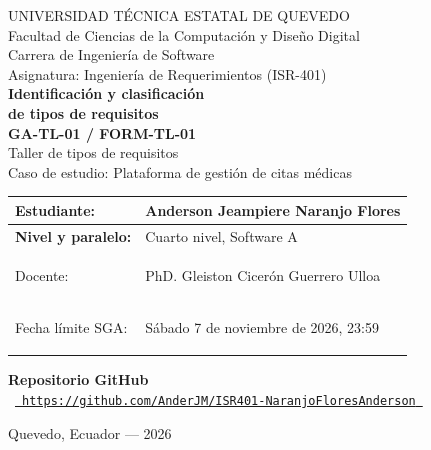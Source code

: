 \documentclass[11pt,a4paper]{article}
\begin{document}
\begin{center}

{\large
UNIVERSIDAD TÉCNICA ESTATAL DE QUEVEDO
}\\[6pt]

{\normalsize
Facultad de Ciencias de la Computación y Diseño Digital
}\\[3pt]

{\normalsize
Carrera de Ingeniería de Software
}\\[14pt]

{\normalsize
Asignatura: Ingeniería de Requerimientos (ISR-401)
}\\[42pt]

{\LARGE\bfseries
Identificación y clasificación\\[4pt]
de tipos de requisitos
}\\[14pt]

{\large\bfseries
GA-TL-01 / FORM-TL-01
}\\[14pt]

{\normalsize
Taller de tipos de requisitos
}\\[8pt]

{\normalsize
Caso de estudio: Plataforma de gestión de citas médicas
}

\end{center}

\vspace{1.4cm}

\begin{tabularx}{\textwidth}{
    |>{\bfseries}p{4.5cm}|X|
}
\hline

Estudiante: &
Anderson Jeampiere Naranjo Flores
\\ \hline

Nivel y paralelo: &
Cuarto nivel, Software A
\\ \hline

Docente: &
PhD. Gleiston Cicerón Guerrero Ulloa
\\ \hline

Fecha límite SGA: &
Sábado 7 de noviembre de 2026, 23:59
\\ \hline

\end{tabularx}

\vspace{1.3cm}

\begin{center}

{\bfseries Repositorio GitHub}\\[12pt]

\mbox{%
\href{https://github.com/AnderJM/ISR401-NaranjoFloresAnderson}{%
\small\nolinkurl{https://github.com/AnderJM/ISR401-NaranjoFloresAnderson}%
}%
}

\end{center}

\vfill

\begin{center}
Quevedo, Ecuador --- 2026
\end{center}
\end{document}
